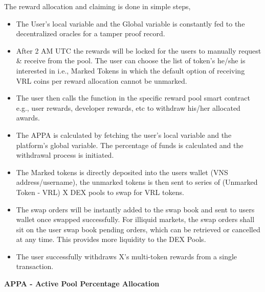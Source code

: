 \documentclass[letterpaper,11pt]{article}
\begin{document}
The reward allocation and claiming is done in simple steps,
\begin{itemize}[wide, labelwidth=!, labelindent=0pt]
\item The User's local variable and the Global variable is constantly fed to the decentralized oracles for a tamper proof record.  
\item After 2 AM UTC the rewards will be locked for the users to manually request \& receive from the pool. The user can choose the list of token's he/she is interested in i.e., Marked Tokens in which the default option of receiving VRL coins per reward allocation cannot be unmarked.
\item The user then calls the function in the specific reward pool smart contract e.g., user rewards, developer rewards, etc to withdraw his/her allocated awards.
\item The APPA is calculated by fetching the user's local variable and the platform's global variable. The percentage of funds is calculated and the withdrawal process is initiated.
\item The Marked tokens is directly deposited into the users wallet (VNS address/username), the unmarked tokens is then sent to series of (Unmarked Token - VRL) X DEX pools to swap for VRL tokens. 
\item The swap orders will be instantly added to the swap book and sent to users wallet once swapped successfully. For illiquid markets, the swap orders shall sit on the user swap book pending orders, which can be retrieved or cancelled at any time. This provides more liquidity to the DEX Pools.
\item The user successfully withdraws X's multi-token rewards from a single transaction.
\end{itemize}

\textbf{APPA - Active Pool Percentage Allocation }\\
\end{document}
